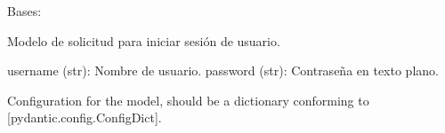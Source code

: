 \documentclass[letterpaper,10pt,spanish]{sphinxmanual}
\begin{document}

\begin{fulllineitems}
\label{\detokenize{modelos:main.UsuarioLogin}}
\pysigstartsignatures
\pysiglinewithargsret
{}
{\sphinxparamcomma {}\sphinxparamcomma {}}
{}
\pysigstopsignatures
\sphinxAtStartPar
Bases: 

\sphinxAtStartPar
Modelo de solicitud para iniciar sesión de usuario.
\begin{description}
\sphinxAtStartPar
username (str): Nombre de usuario.
password (str): Contraseña en texto plano.

\end{description}

\begin{fulllineitems}
\label{\detokenize{modelos:main.UsuarioLogin.model_config}}
\pysigstartsignatures
\pysigline
{}
\pysigstopsignatures
\sphinxAtStartPar
Configuration for the model, should be a dictionary conforming to {[}\sphinxtitleref{ConfigDict}{]}{[}pydantic.config.ConfigDict{]}.

\end{fulllineitems}


\end{fulllineitems}

\end{document}
